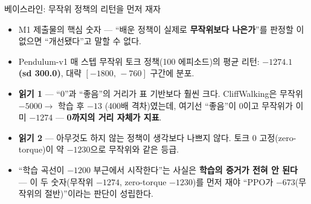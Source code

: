 \begin{frame}{베이스라인: 무작위 정책의 리턴을 먼저 재자}
  \begin{itemize}
    \item M1 제출물의 핵심 숫자 — ``배운 정책이 실제로 \textbf{무작위보다
      나은가}''를 판정할 이 없으면 ``개선됐다''고 말할 수 없다.
    \item Pendulum-v1 매 스텝 무작위 토크 정책(100 에피소드)의 평균 리턴:
      \textbf{$-1274.1$ (sd 300.0)}, 대략 $[-1800,\,-760]$ 구간에 분포.
    \item \textbf{읽기 1} — ``0''과 ``좋음''의 거리가 표 기반보다 훨씬 크다.
      CliffWalking은 무작위 $-5000 \to$ 학습 후 $-13$ (400배 격차)였는데,
      여기선 ``좋음''이 0이고 무작위가 이미 $-1274$ — \textbf{0까지의 거리
      자체가 지표}.
    \item \textbf{읽기 2} — 아무것도 하지 않는 정책이 생각보다 나쁘지 않다.
      토크 0 고정(zero-torque)이 약 \textbf{$-1230$}으로 무작위와 같은 등급.
    \item ``학습 곡선이 $-1200$ 부근에서 시작한다''는 사실은 \textbf{학습의
      증거가 전혀 안 된다} — 이 두 숫자(무작위 $-1274$, zero-torque $-1230$)를
      먼저 재야 ``PPO가 $-673$(무작위의 절반)''이라는 판단이 성립한다.
  \end{itemize}
\end{frame}
